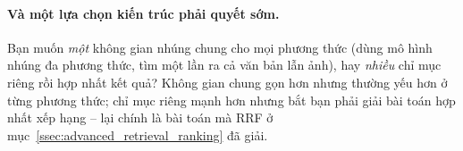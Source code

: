 \paragraph{Và một lựa chọn kiến trúc phải quyết sớm.} Bạn muốn \emph{một} không gian nhúng chung cho mọi phương thức (dùng mô hình nhúng đa phương thức, tìm một lần ra cả văn bản lẫn ảnh), hay \emph{nhiều} chỉ mục riêng rồi hợp nhất kết quả? Không gian chung gọn hơn nhưng thường yếu hơn ở từng phương thức; chỉ mục riêng mạnh hơn nhưng bắt bạn phải giải bài toán hợp nhất xếp hạng -- lại chính là bài toán mà RRF ở mục~\ref{ssec:advanced_retrieval_ranking} đã giải.
